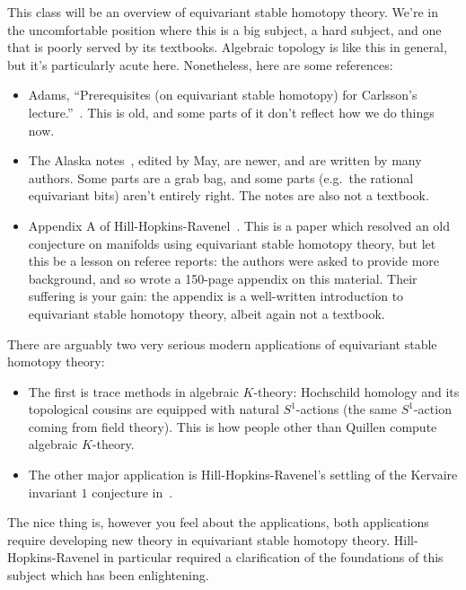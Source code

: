 
This class will be an overview of equivariant stable homotopy theory. We're in the uncomfortable position where
this is a big subject, a hard subject, and one that is poorly served by its textbooks. Algebraic topology is like
this in general, but it's particularly acute here. Nonetheless, here are some references:
\begin{itemize}
	\item Adams, ``Prerequisites (on equivariant stable homotopy) for Carlsson's lecture.''~\cite{Adams84}. This is
	old, and some parts of it don't reflect how we do things now.
	\item The Alaska notes~\cite{AlaskaNotes}, edited by May, are newer, and are written by many authors. Some
	parts are a grab bag, and some parts (e.g.\ the rational equivariant bits) aren't entirely right. The notes are
	also not a textbook.
	\item Appendix A of Hill-Hopkins-Ravenel~\cite{HHR}. This is a paper which resolved an old conjecture on
	manifolds using equivariant stable homotopy theory, but let this be a lesson on referee reports: the authors
	were asked to provide more background, and so wrote a 150-page appendix on this material. Their suffering is
	your gain: the appendix is a well-written introduction to equivariant stable homotopy theory, albeit again not
	a textbook.
\end{itemize}

There are arguably two very serious modern applications of equivariant stable homotopy theory: 

\begin{itemize}
	\item The first is trace methods in algebraic $K$-theory: Hochschild homology and its topological cousins are
	equipped with natural $S^1$-actions (the same $S^1$-action coming from field theory). This is how people
	other than Quillen compute algebraic $K$-theory.
	\item The other major application is Hill-Hopkins-Ravenel's settling of the Kervaire invariant $1$ conjecture
	in~\cite{HHR}.
\end{itemize}
The nice thing is, however you feel about the applications, both applications require developing new theory in
equivariant stable homotopy theory. Hill-Hopkins-Ravenel in particular required a clarification of the foundations
of this subject which has been enlightening.

